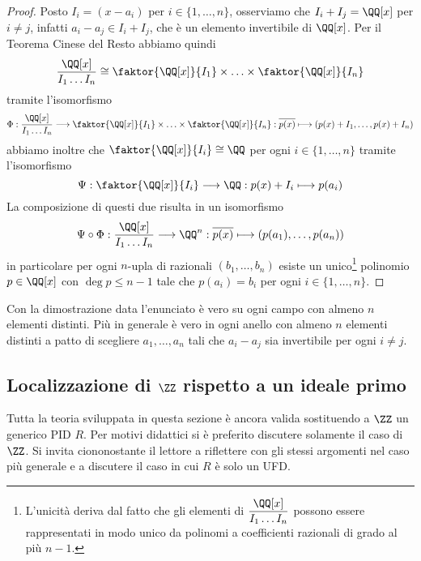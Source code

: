 \documentclass[11pt]{scrartcl}
\begin{document}
	\begin{proof}
		Posto $I_i = (x - a_i)$ per $i \in \{1, \ldots, n\}$, osserviamo che 
		$I_i + I_j = \QQ[x]$ per $i \neq j$, infatti $a_i - a_j \in I_i + I_j$, 
		che è un elemento invertibile di $\QQ[x]$. Per il Teorema Cinese del Resto
		abbiamo quindi
		\[
		\frac{\QQ[x]}{I_1\ldots I_n} \cong \faktor{\QQ[x]}{I_1}\times 
		\ldots \times \faktor{\QQ[x]}{I_n}
		\]
		tramite l'isomorfismo
		\[
		\Phi: \frac{\QQ[x]}{I_1\ldots I_n} \longrightarrow \faktor{\QQ[x]}{I_1}\times 
		\ldots \times \faktor{\QQ[x]}{I_n}: \overline{p(x)}\longmapsto
		(p(x) + I_1, \ldots, p(x) + I_n)
		\]
		abbiamo inoltre che $\faktor{\QQ[x]}{I_i} \cong \QQ$ per ogni $i \in \{1, \ldots, n\}$
		tramite l'isomorfismo
		\[
		\Psi: \faktor{\QQ[x]}{I_i} \longrightarrow \QQ: p(x) + I_i \longmapsto p(a_i)
		\]
		La composizione di questi due risulta in un isomorfismo
		\[
		\Psi\circ\Phi: \frac{\QQ[x]}{I_1\ldots I_n}\longrightarrow \QQ^n:
		\overline{p(x)}\longmapsto (p(a_1), \ldots, p(a_n))
		\]
		in particolare per ogni $n$-upla di razionali $(b_1, \ldots, b_n)$ esiste
		un unico\footnote{
			L'unicità deriva dal fatto che gli elementi di $\displaystyle\frac{\QQ[x]}{I_1\ldots I_n}$
			possono essere rappresentati in modo unico da polinomi a coefficienti 
			razionali di grado al più $n - 1$.
		} polinomio $p \in \QQ[x]$ con $\deg p \leq n - 1$ tale che 
		$p(a_i) = b_i$ per ogni $i \in \{1, \ldots, n\}$.
	\end{proof}
	
	\begin{remark}
		Con la dimostrazione data l'enunciato è vero su ogni campo con almeno 
		$n$ elementi distinti. Più in generale è vero in ogni anello con almeno $n$
		elementi distinti a patto di scegliere $a_1, \ldots, a_n$ tali che $a_i - a_j$
		sia invertibile per ogni $i \neq j$.
	\end{remark}
	
	\newpage
	
	\subsection{Localizzazione di $\ZZ$ rispetto a un ideale primo}

	\begin{premessa*}
		Tutta la teoria sviluppata in questa sezione è ancora valida sostituendo a
		$\ZZ$ un generico PID $R$. Per motivi didattici si è preferito discutere
		solamente il caso di $\ZZ$. Si invita ciononostante il lettore a
		riflettere con gli stessi argomenti nel caso più generale e a discutere
		il caso in cui $R$ è solo un UFD.
	\end{premessa*}
\end{document}
